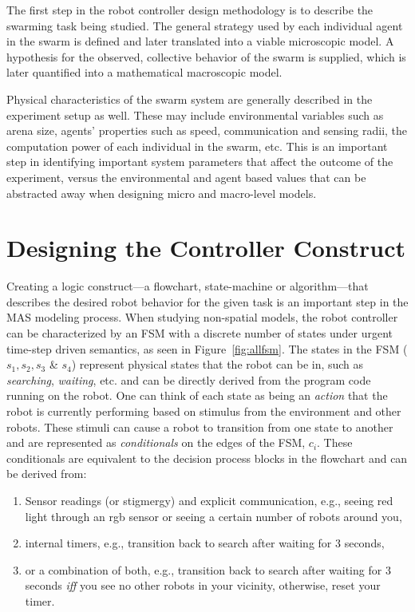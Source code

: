 \documentclass[defaultstyle,12pt]{proposal}
\begin{document}
The first step in the robot controller design methodology is to describe the swarming task being studied. The general strategy used by each individual agent in the swarm is defined and later translated into a viable microscopic model. A hypothesis for the observed, collective behavior of the swarm is supplied, which is later quantified into a mathematical macroscopic model.

Physical characteristics of the swarm system are generally described in the experiment setup as well. These may include environmental variables such as arena size, agents' properties such as speed, communication and sensing radii, the computation power of each individual in the swarm, etc. This is an important step in identifying important system parameters that affect the outcome of the experiment, versus the environmental and agent based values that can be abstracted away when designing micro and macro-level models.
 
\section{Designing the Controller Construct}
Creating a logic construct---a flowchart, state-machine or algorithm---that describes the desired robot behavior for the given task is an important step in the MAS modeling process. When studying non-spatial models, the robot controller can be characterized by an FSM with a discrete number of states under urgent time-step driven semantics, as seen in Figure~\ref{fig:allfsm}. The states in the FSM ($s_1, s_2, s_3$ \& $s_4$) represent physical states that the robot can be in, such as  \emph{searching}, \emph{waiting}, etc. and can be directly derived from the program code running on the robot. One can think of each state as being an \emph{action} that the robot is currently performing based on stimulus from the environment and other robots. These stimuli can cause a robot to transition from one state to another and are represented as \emph{conditionals} on the edges of the FSM, $c_i$. These conditionals are equivalent to the decision process blocks in the flowchart and can be derived from:
\begin{enumerate}
\item Sensor readings (or stigmergy) and explicit communication, e.g., seeing red light through an rgb sensor or seeing a certain number of robots around you,
\item internal timers, e.g., transition back to search after waiting for 3 seconds,
\item or a combination of both, e.g., transition back to search after waiting for 3 seconds \emph{iff} you see no other robots in your vicinity, otherwise, reset your timer.
\end{enumerate}
\end{document}
